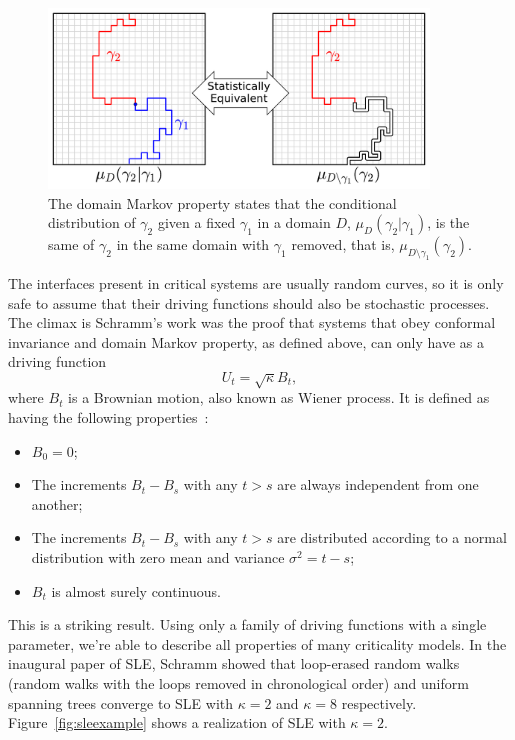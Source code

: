 \begin{figure}[b]
\begin{center}
    \includegraphics[width=0.9\textwidth]{chapters/ch4-sle/figs/sle_dmp}
\end{center}
\caption{The domain Markov property states that the conditional distribution of
    $\gamma_2$ given a fixed $\gamma_1$ in a domain $D$,
    $\mu_D(\gamma_2|\gamma_1)$, is the same of $\gamma_2$ in the same domain
    with $\gamma_1$ removed, that is, $\mu_{D\setminus\gamma_1}(\gamma_2)$.}
\label{fig:dmp}
\end{figure}


The interfaces present in critical systems are usually random curves, so it is
only safe to assume that their driving functions should also be stochastic
processes. The climax is Schramm's work was the proof that systems that obey
conformal invariance and domain Markov property, as defined above, can only
have as a driving function
\begin{equation}
    U_{t}=\sqrt{\kappa}B_{t},
\end{equation}
where $B_t$ is a Brownian motion, also known as Wiener process.
It is defined as having the following properties~\cite{Durrett1996}:
\begin{itemize}
    \item $B_0=0$;
    \item The increments $B_t-B_s$ with any $t>s$ are always independent from
        one another;
    \item The increments $B_t-B_s$ with any $t>s$ are distributed according to
        a normal distribution with zero mean and variance $\sigma^2=t-s$;
    \item $B_t$ is almost surely continuous.
\end{itemize}
This is a striking result. Using only a family of driving functions with a
single parameter, we're able to describe all properties of many criticality
models. In the inaugural paper of SLE, Schramm showed that loop-erased random
walks (random walks with the loops removed in chronological order) and uniform
spanning trees converge to SLE with $\kappa=2$ and $\kappa=8$ respectively.
Figure~\ref{fig:sleexample} shows a realization of SLE with $\kappa=2$.

